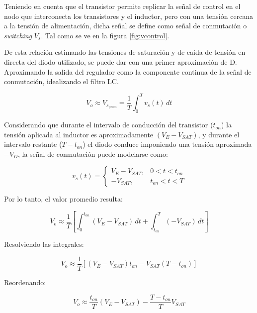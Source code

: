 \documentclass[]{article}
\begin{document}
	Teniendo en cuenta que el transistor permite replicar la señal de control en el nodo que interconecta los transistores y el inductor, pero con una tensión cercana a la tensión de alimentación, dicha señal se define como señal de conmutación o \textit{switching} $V_s$. Tal como se ve en la figura \ref{fig:vcontrol}.
	
	
	De esta relación estimando las tensiones de saturación y de caida de tensión en directa del diodo utilizado, se puede dar con una primer aproximación de D. Aproximando la salida del regulador como la componente continua de la señal de conmutación, idealizando el filtro LC.
	
	
	\begin{equation}
		V_o \approx V_{s_{\text{prom}}}
		=
		\frac{1}{T}\int_0^T v_s(t)\,dt
	\end{equation}
	
	Considerando que durante el intervalo de conducción del transistor ($t_{on}$) la tensión aplicada al inductor es aproximadamente $(V_E - V_{SAT})$, y durante el intervalo restante ($T-t_{on}$) el diodo conduce imponiendo una tensión aproximada $-V_D$, la señal de conmutación puede modelarse como:
	
	\begin{equation}
		v_s(t)=
		\begin{cases}
			V_E - V_{SAT}, & 0<t<t_{on} \\
			-V_{SAT}, & t_{on}<t<T
		\end{cases}
	\end{equation}
	
	Por lo tanto, el valor promedio resulta:
	
	\begin{equation}
		V_o \approx
		\frac{1}{T}
		\left[
		\int_0^{t_{on}} (V_E - V_{SAT})\,dt
		+
		\int_{t_{on}}^T (-V_{SAT})\,dt
		\right]
	\end{equation}
	
	Resolviendo las integrales:
	
	\begin{equation}
		V_o \approx
		\frac{1}{T}
		\left[
		(V_E - V_{SAT})t_{on}
		-
		V_{SAT}(T-t_{on})
		\right]
	\end{equation}
	
	Reordenando:
	
	\begin{equation}
		V_o \approx
		\frac{t_{on}}{T}(V_E - V_{SAT})
		-
		\frac{T-t_{on}}{T}V_{SAT}
	\end{equation}
	
\end{document}
